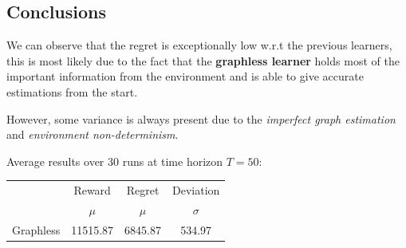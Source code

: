 \subsection{Conclusions}

We can observe that the regret is exceptionally low w.r.t the previous learners, this is most likely due to the fact that the \textbf{graphless learner} holds most of the important information from the environment and is able to give accurate estimations from the start.

However, some variance is always present due to the \textit{imperfect graph estimation} and \textit{environment non-determinism}.

Average results over 30 runs at time horizon $T = 50$:

\begin{table}[h]
	\begin{tabular}{|c|cc|c|}
	\hline \hline
		\cellcolor{blue!25} & Reward 	& Regret	& Deviation \\
	\cline{2-4}
		\cellcolor{blue!25} & $\mu$		& $\mu$		& $\sigma$	\\
	\hline \hline
		Graphless			& 11515.87 	& 6845.87	& 534.97 	\\
	\hline \hline
	\end{tabular}
\end{table}

